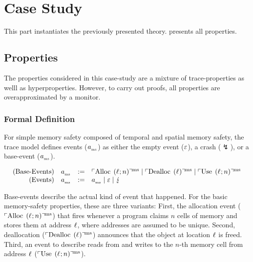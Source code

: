 \documentclass[a4paper,12pt]{article}
\begin{document}
\section{Case Study}\label{sec-cs}
This part instantiates the previously presented theory. 
 presents all properties. 

\subsection{Properties}\label{subsec-cs-properties}

The properties considered in this case-study are a mixture of trace-properties as welll as hyperproperties.
However, to carry out proofs, all properties are overapproximated by a monitor.

\subsubsection{Formal Definition}\label{subsubsec-cs-properties-formaldef}

For simple memory safety composed of temporal and spatial memory safety, the trace model defines events ($\varEvent[_{\mssafe}]$) as either the empty event ($\emptyevent$), a crash ($\lightning$), or a base-event ($\varEvent[_{\mssafe}]$).

\begin{definition}{}
\[
  \begin{array}{rcll}
    \text{(Base-Events)}&\varEvent[_{\mssafe}] &:=& \msAlloc \mid \msDealloc \mid \msUse \\
    \text{(Events)}&\varEvent[_{\mssafe}] &:=& \varEvent[_{\mssafe}] \mid \emptyevent \mid \lightning \\ 
  \end{array}
\]
\end{definition}

Base-events describe the actual kind of event that happened.
For the basic memory-safety properties, these are three variants:
First, the allocation event ($\msAlloc$) that fires whenever a program claims $n$ cells of memory and stores them at address $\varLoc$, where addresses are assumed to be unique.
Second, deallocation ($\msDealloc$) announces that the object at location $\varLoc$ is freed.
Third, an event to describe reads from and writes to the $n$-th memory cell from address $\varLoc$ ($\msUse$).
\end{document}
